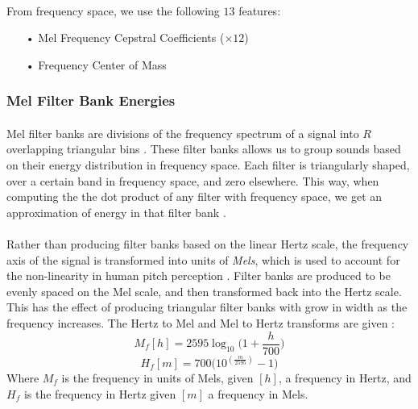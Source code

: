 \documentclass[12pt,letterpaper]{article}
\begin{document}
\paragraph*{}From frequency space, we use the following $13$ features:
\begin{itemize}
\item[•] Mel Frequency Cepstral Coefficients ($\times 12$)
\item[•] Frequency Center of Mass
\end{itemize}


\subsubsection{Mel Filter Bank Energies}

\paragraph*{}Mel filter banks are divisions of the frequency spectrum of a signal into $R$ overlapping triangular bins \cite{Sahidullah}. These filter banks allows us to group sounds based on their energy distribution in frequency space. Each filter is triangularly shaped, over a certain band in frequency space, and zero elsewhere. This way, when computing the the dot product of any filter with frequency space, we get an approximation of energy in that filter bank \cite{Sahidullah,Serizel}. 

\paragraph*{}Rather than producing filter banks based on the linear Hertz scale, the frequency axis of the signal is transformed into units of \textit{Mels}, which is used to account for the non-linearity in human pitch perception \cite{Serizel,Kahn}. Filter banks are produced to be evenly spaced on the Mel scale, and then transformed back into the Hertz scale. This has the effect of producing triangular filter banks with grow in width as the frequency increases. The Hertz to Mel and Mel to Hertz transforms are given \cite{Serizel,Kahn}:
\begin{equation}
\label{eqn-HztoMel}
M_f[h] = 2595 \log_{10}\big(1+ \frac{h}{700}\big)
\end{equation}
\begin{equation}
\label{eqn-MeltoHz}
H_f[m] = 700 \big(10^{(\frac{m}{2595})}-1\big)
\end{equation}
Where $M_f$ is the frequency in units of Mels, given $[h]$, a frequency in Hertz, and $H_f$ is the frequency in Hertz given $[m]$ a frequency in Mels.
\end{document}
